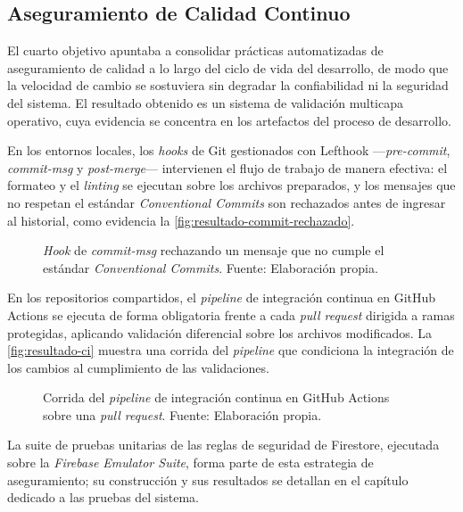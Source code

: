 \subsection{Aseguramiento de Calidad Continuo}\label{subsec:resultado-d}

El cuarto objetivo apuntaba a consolidar prácticas automatizadas de aseguramiento de calidad a lo largo del ciclo de vida del desarrollo, de modo que la velocidad de cambio se sostuviera sin degradar la confiabilidad ni la seguridad del sistema. El resultado obtenido es un sistema de validación multicapa operativo, cuya evidencia se concentra en los artefactos del proceso de desarrollo.

En los entornos locales, los \textit{hooks} de Git gestionados con Lefthook —\textit{pre-commit}, \textit{commit-msg} y \textit{post-merge}— intervienen el flujo de trabajo de manera efectiva: el formateo y el \textit{linting} se ejecutan sobre los archivos preparados, y los mensajes que no respetan el estándar \textit{Conventional Commits} son rechazados antes de ingresar al historial, como evidencia la \autoref{fig:resultado-commit-rechazado}.

\newcommand\resultadoCommitCaption{\textit{Hook} de \textit{commit-msg} rechazando un mensaje que no cumple el estándar \textit{Conventional Commits}. \hspace{1em}}
\begin{figure}[H]
  \centering
  \caption[\resultadoCommitCaption]{\resultadoCommitCaption Fuente: Elaboración propia.}
  \label{fig:resultado-commit-rechazado}
\end{figure}

En los repositorios compartidos, el \textit{pipeline} de integración continua en GitHub Actions se ejecuta de forma obligatoria frente a cada \textit{pull request} dirigida a ramas protegidas, aplicando validación diferencial sobre los archivos modificados. La \autoref{fig:resultado-ci} muestra una corrida del \textit{pipeline} que condiciona la integración de los cambios al cumplimiento de las validaciones.

\newcommand\resultadoCiCaption{Corrida del \textit{pipeline} de integración continua en GitHub Actions sobre una \textit{pull request}. \hspace{1em}}
\begin{figure}[H]
  \centering
  \caption[\resultadoCiCaption]{\resultadoCiCaption Fuente: Elaboración propia.}
  \label{fig:resultado-ci}
\end{figure}

La suite de pruebas unitarias de las reglas de seguridad de Firestore, ejecutada sobre la \textit{Firebase Emulator Suite}, forma parte de esta estrategia de aseguramiento; su construcción y sus resultados se detallan en el capítulo dedicado a las pruebas del sistema.
